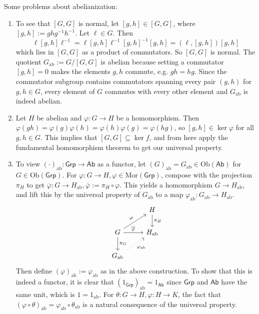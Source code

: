 \begin{ex}[Abelianization]
    Some problems about abelianization:
    \begin{enumerate}[label=(\arabic*)]
    \setlength\itemsep{-.2em}
\item To see that $[G,G]$ is normal, let $[g,h] \in [G,G]$, where $[g,h]:= gh g^{-1}h^{-1}$. Let $\ell \in G$. Then 
    \[
        \ell[g,h]\ell ^{-1}= \ell [g,h]\ell ^{-1} [g,h]^{-1}[g,h]=(\ell, [g,h])[g,h] 
    \] which lies in $[G,G]$ as a product of commutators. So $[G,G]$ is normal. The quotient $G _{\mathrm{ab}}:= G / [G,G]$ is abelian because setting a commutator $[g,h]=0$ makes the elements  $g,h$ commute, e.g. $gh=hg$. Since the commutator subgroup contains commutators spanning every pair $(g,h)$ for $g,h \in G$, every element of $G$ commutes with every other element and $G _{\mathrm{ab}}$ is indeed abelian.
\item Let $H$ be abelian and $\varphi \colon G \to H$ be a homomorphism. Then $\varphi (gh)=\varphi (g)\varphi (h)=\varphi (h)\varphi (g)=\varphi (hg)$, so $[g,h] \in \ker \varphi $ for all $g,h \in G$. This implies that $[G,G] \subseteq \ker f$, and from here apply the fundamental homomorphism theorem to get our universal property.
\item To view $\left( \cdot  \right) _{\mathrm{ab}} \colon \mathsf{Grp}  \to \mathsf{Ab} $ as a functor, let $(G)_{\mathrm{ab}}=G _{\mathrm{ab}} \in \mathrm{Ob}(\mathsf{Ab}) $ for $G \in  \mathrm{Ob}(\mathsf{Grp} )$. For $\varphi \colon G \to H , \varphi  \in  \mathrm{Mor}(\mathsf{Grp} )$, compose with the projection $\pi_H$ to get $\overline{\varphi }\colon G \to H _{\mathrm{ab}}, \overline{\varphi }:= \pi_H \circ \varphi $. This yields a homomorphism $G \to H_{\mathrm{ab}}$, and lift this by the universal property of $G_{\mathrm{ab}}$ to a map $\varphi  _{\mathrm{ab}}\colon G_{\mathrm{ab}} \to H_{\mathrm{ab}}$. 
\[
\begin{tikzcd}
                                                                           & H \arrow[d, "\pi_H"] \\
G \arrow[d, "\pi_G"] \arrow[r, "\overline{\varphi}"] \arrow[ru, "\varphi"] & H_{\mathrm{ab}}      \\
G_{\mathrm{ab}} \arrow[ru, "\varphi_{\mathrm{ab}}"', dotted]               &                     
\end{tikzcd}
\] 
Then define $(\varphi )_{\mathrm{ab}}:=\varphi _{\mathrm{ab}}$ as in the above construction. To show that this is indeed a functor, it is clear that $(1_{\mathsf{Grp} })_{\mathrm{ab}}=1_{\mathsf{Ab} }$ since $\mathsf{Grp} $ and $\mathsf{Ab} $ have the same unit, which is $1=1_{\mathrm{ab}}$. For $\theta \colon G \to H, \varphi \colon H \to K$, the fact that $\left( \varphi  \circ \theta \right) _{\mathrm{ab}}=\varphi  _{\mathrm{ab}}\circ \theta _{\mathrm{ab}}$ is a natural consequence of the universal property. \[
\]
\end{enumerate}
\end{ex}
